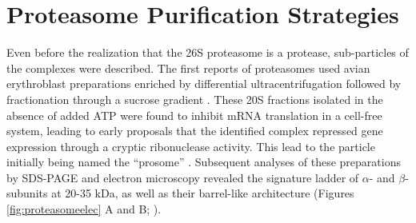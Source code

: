 \section{Proteasome Purification Strategies}
	Even before the realization that the 26S proteasome is a protease, sub-particles of the complexes were described.  The first reports of proteasomes used avian erythroblast preparations enriched by differential ultracentrifugation followed by fractionation through a sucrose gradient \citep{schmid84}.  These 20S fractions isolated in the absence of added ATP were found to inhibit mRNA translation in a cell-free system, leading to early proposals that the identified complex repressed gene expression through a cryptic ribonuclease activity.  This lead to the particle initially being named the ``prosome'' \citep{kremp86, schmid84}.  Subsequent analyses of these preparations by SDS-PAGE and electron microscopy revealed the signature ladder of $\alpha$- and $\beta$-subunits at 20-35 kDa, as well as their barrel-like architecture (Figures \ref{fig:proteasomeelec} A and B; \citep{baumeister88, kremp86, schmid84}).
